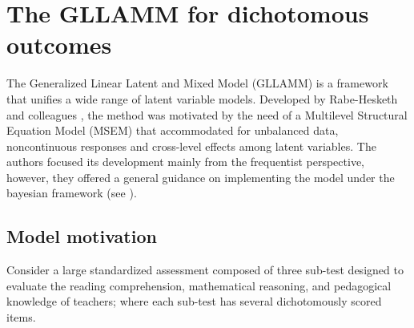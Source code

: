 \chapter{The GLLAMM for dichotomous outcomes} \label{chap:framework}

The Generalized Linear Latent and Mixed Model (GLLAMM) is a framework that unifies a wide range of latent variable models. Developed by Rabe-Hesketh and colleagues \cite{Rabe_et_al_2004a, Rabe_et_al_2004b, Rabe_et_al_2004c, Skrondal_et_al_2004a, Rabe_et_al_2012}, the method was motivated by the need of a Multilevel Structural Equation Model (MSEM) that accommodated for unbalanced data, noncontinuous responses and cross-level effects among latent variables. The authors focused its development mainly from the frequentist perspective, however, they offered a general guidance on implementing the model under the bayesian framework (see \citet{Skrondal_et_al_2004a}).


\section{Model motivation} \label{sect:motivation}

Consider a large standardized assessment composed of three sub-test designed to evaluate the reading comprehension, mathematical reasoning, and pedagogical knowledge of teachers; where each sub-test has several dichotomously scored items. 

